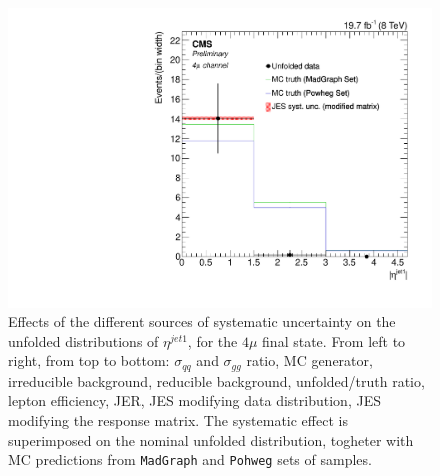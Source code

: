 \begin{figure}[hbtp]
\begin{center}
   \includegraphics[width=0.8\cmsFigWidth]{Figures/Unfolding/Systematics/ZZTo4m_EtaJet1_JES_ModMat_Mad_fr}
   \caption{Effects of the different sources of systematic uncertainty on the unfolded distributions of  $\eta^{jet1}$, for the     
   $4\mu$ final state. From left to right, from top to bottom: $\sigma_{qq}$ and $\sigma_{gg}$ ratio, MC generator, irreducible background, reducible background, unfolded/truth ratio, lepton efficiency, JER, JES modifying data distribution, JES modifying the response matrix. The systematic effect is superimposed on the nominal unfolded distribution, togheter with MC predictions from \texttt{MadGraph} and \texttt{Pohweg} sets of samples.}
   \label{fig:EtaJet1_syst_4m}
 \end{center}
\end{figure}

